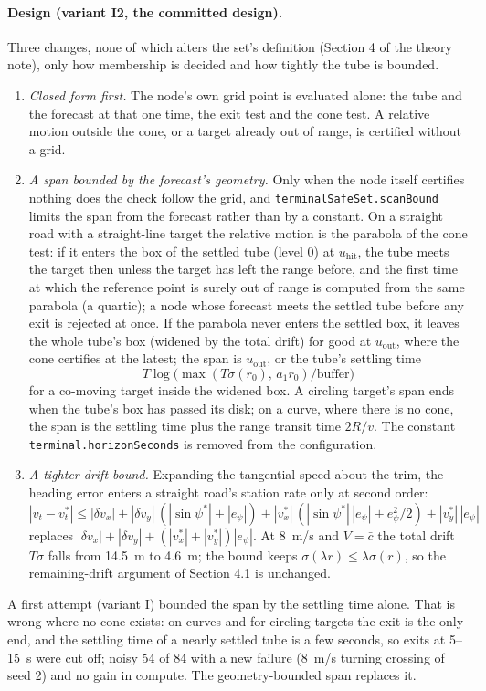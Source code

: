 \documentclass[11pt]{article}
\begin{document}
\paragraph{Design (variant I2, the committed design).} Three changes, none of
which alters the set's definition (Section 4 of the theory note), only how
membership is decided and how tightly the tube is bounded.
\begin{enumerate}
\item \emph{Closed form first.} The node's own grid point is evaluated alone:
  the tube and the forecast at that one time, the exit test and the cone test.
  A relative motion outside the cone, or a target already out of range, is
  certified without a grid.
\item \emph{A span bounded by the forecast's geometry.} Only when the node
  itself certifies nothing does the check follow the grid, and
  \texttt{terminalSafeSet.scanBound} limits the span from the forecast rather
  than by a constant. On a straight road with a straight-line target the
  relative motion is the parabola of the cone test: if it enters the box of
  the settled tube (level 0) at $u_{\mathrm{hit}}$, the tube meets the target
  then unless the target has left the range before, and the first time at
  which the reference point is surely out of range is computed from the same
  parabola (a quartic); a node whose forecast meets the settled tube before
  any exit is rejected at once. If the parabola never enters the settled box,
  it leaves the whole tube's box (widened by the total drift) for good at
  $u_{\mathrm{out}}$, where the cone certifies at the latest; the span is
  $u_{\mathrm{out}}$, or the tube's settling time
  \[ T\log\bigl(\max(T\sigma(r_0),\,a_1 r_0)/\text{buffer}\bigr) \]
  for a co-moving target inside the widened box. A circling target's span ends when the tube's box
  has passed its disk; on a curve, where there is no cone, the span is the
  settling time plus the range transit time $2R/v$. The constant
  \texttt{terminal.horizonSeconds} is removed from the configuration.
\item \emph{A tighter drift bound.} Expanding the tangential speed about the
  trim, the heading error enters a straight road's station rate only at
  second order:
  \[ |v_t-v_t^*|\le|\delta v_x|+|\delta v_y|\,(|\sin\psi^*|+|e_\psi|)
     +|v_x^*|\,(|\sin\psi^*|\,|e_\psi|+e_\psi^2/2)+|v_y^*|\,|e_\psi| \]
  replaces $|\delta v_x|+|\delta v_y|+(|v_x^*|+|v_y^*|)|e_\psi|$. At 8~m/s and
  $V=\bar c$ the total drift $T\sigma$ falls from 14.5~m to 4.6~m; the bound
  keeps $\sigma(\lambda r)\le\lambda\sigma(r)$, so the remaining-drift
  argument of Section 4.1 is unchanged.
\end{enumerate}
A first attempt (variant I) bounded the span by the settling time alone. That
is wrong where no cone exists: on curves and for circling targets the exit is
the only end, and the settling time of a nearly settled tube is a few seconds,
so exits at 5--15~s were cut off; noisy 54 of 84 with a new failure
(8~m/s turning crossing of seed 2) and no gain in compute. The
geometry-bounded span replaces it.
\end{document}
